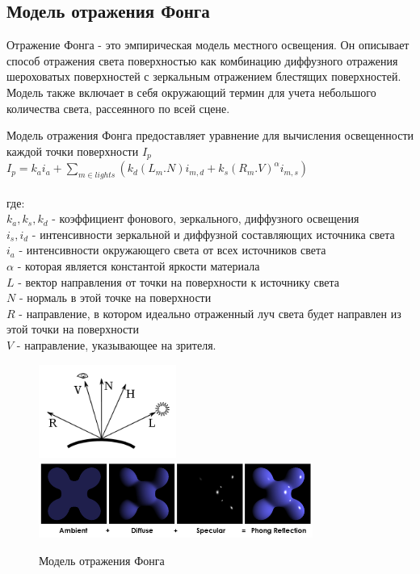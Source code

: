 \subsection*{Модель отражения Фонга}

Отражение Фонга - это эмпирическая модель местного освещения. Он описывает способ отражения света поверхностью как комбинацию диффузного отражения шероховатых поверхностей с зеркальным отражением блестящих поверхностей. Модель также включает в себя окружающий термин для учета небольшого количества света, рассеянного по всей сцене.

Модель отражения Фонга предоставляет уравнение для вычисления освещенности каждой точки поверхности $I_p$
\\

$
{\displaystyle I_p = k_ai_a + \sum_{m\in lights}(k_d(L_m.N)i_{m,d} + k_s(R_m.V)^\alpha i_{m,s})}
$\\\\
где:\\
$k_a, k_s, k_d$ - коэффициент фонового, зеркального, диффузного освещения\\
$i_s, i_d$ - интенсивности зеркальной и диффузной составляющих источника света\\
$i_a$ - интенсивности окружающего света от всех источников света\\
$\alpha$ - которая является константой яркости материала\\
$L$ - вектор направления от точки на поверхности к источнику света\\
$N$ - нормаль в этой точке на поверхности\\
$R$ - направление, в котором идеально отраженный луч света будет направлен из этой точки на поверхности\\
$V$ - направление, указывающее на зрителя.

\begin{figure}[ht]
  \centering
  \includegraphics[width=0.4\textwidth]{img/blinn_vectors.png}
  \includegraphics[width=0.8\textwidth]{img/phong_components.png}
  \caption{Модель отражения Фонга}
\end{figure}


